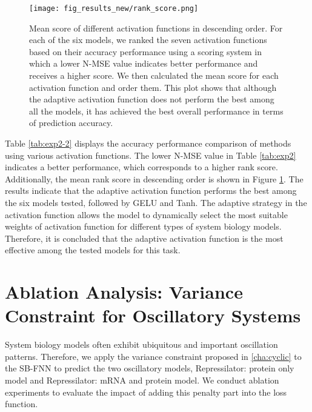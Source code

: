 \begin{figure}[h]
\centering
\texttt{[image: fig\_results\_new/rank\_score.png]}
\caption[Mean score of different activation functions in descending order.] {Mean score of different activation functions in descending order. For each of the six models, we ranked the seven activation functions based on their accuracy performance using a scoring system in which a lower N-MSE value indicates better performance and receives a higher score. We then calculated the mean score for each activation function and order them. This plot shows that although the adaptive activation function does not perform the best among all the models, it has achieved the best overall performance in terms of prediction accuracy.}
\label{fig:rank_score}
\end{figure}

Table \ref{tab:exp2-2} displays the accuracy performance comparison of methods using various activation functions. The lower N-MSE value in Table \ref{tab:exp2} indicates a better performance, which corresponds to a higher rank score. Additionally, the mean rank score in descending order is shown in Figure \ref{fig:rank_score}. The results indicate that the adaptive activation function performs the best among the six models tested, followed by GELU and Tanh. The adaptive strategy in the activation function allows the model to dynamically select the most suitable weights of activation function for different types of system biology models. Therefore, it is concluded that the adaptive activation function is the most effective among the tested models for this task.


\section{Ablation Analysis: Variance Constraint for Oscillatory Systems}

System biology models often exhibit ubiquitous and important oscillation patterns. Therefore, we apply the variance constraint proposed in \ref{cha:cyclic} to the SB-FNN to predict the two oscillatory models, Repressilator: protein only model and Repressilator: mRNA and protein model. We conduct ablation experiments to evaluate the impact of adding this penalty part into the loss function.

